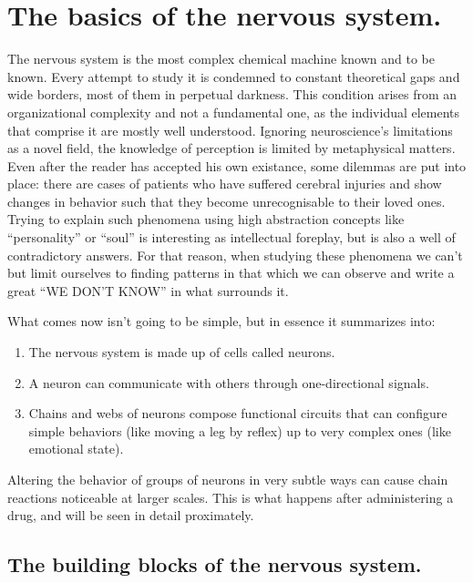 \section{The basics of the nervous system.}

The nervous system is the most complex chemical machine known and to be known. Every attempt to study it is condemned to constant theoretical gaps and wide borders, most of them in perpetual darkness. This condition arises from an organizational complexity and not a fundamental one, as the individual elements that comprise it are mostly well understood. Ignoring neuroscience's limitations as a novel field, the knowledge of perception is limited by metaphysical matters. Even after the reader has accepted his own existance, some dilemmas are put into place: there are cases of patients who have suffered cerebral injuries and show changes in behavior such that they become unrecognisable to their loved ones. Trying to explain such phenomena using high abstraction concepts like \enquote{personality} or \enquote{soul} is interesting as intellectual foreplay, but is also a well of contradictory answers. For that reason, when studying these phenomena we can't but limit ourselves to finding patterns in that which we can observe and write a great \enquote{WE DON'T KNOW} in what surrounds it.  

What comes now isn't going to be simple, but in essence it summarizes into:

\begin{enumerate}
	\item The nervous system is made up of cells called neurons.
	\item A neuron can communicate with others through one-directional signals.
	\item Chains and webs of neurons compose functional circuits that can configure simple behaviors (like moving a leg by reflex) up to very complex ones (like emotional state).
\end{enumerate}

Altering the behavior of groups of neurons in very subtle ways can cause chain reactions noticeable at larger scales. This is what happens after administering a drug, and will be seen in detail proximately.

\subsection{The building blocks of the nervous system.}

